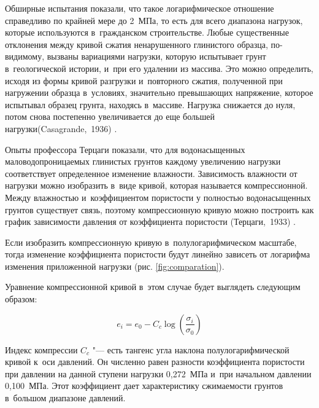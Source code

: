 Обширные испытания показали, что такое логарифмическое отношение справедливо по крайней мере до 2~МПа, то есть для всего диапазона нагрузок, которые используются в~гражданском строительстве.
Любые существенные отклонения между кривой сжатия ненарушенного глинистого образца, по-видимому, вызваны вариациями нагрузки, которую испытывает грунт в~геологической истории, и~при его удалении из массива.
Это можно определить, исходя из формы кривой разгрузки и~повторного сжатия, полученной при нагружении образца в~условиях, значительно превышающих напряжение, которое испытывал образец грунта, находясь в~массиве.
Нагрузка снижается до нуля, потом снова постепенно увеличивается до еще большей нагрузки(Casagrande,~1936) \cite{cazagrande1936}.

 Опыты профессора Терцаги показали, что для водонасыщенных маловодопроницаемых глинистых грунтов каждому увеличению нагрузки соответствует определенное изменение влажности. 
 Зависимость влажности от нагрузки можно изобразить в~виде кривой,
 которая называется компрессионной. 
 Между влажностью и~коэффициентом пористости у полностью водонасыщенных грунтов существует связь, поэтому компрессионную кривую можно построить как график зависимости давления от коэффициента пористости (Терцаги,~1933) \cite{terz1933}.



 Если изобразить компрессионную кривую в~полулогарифмическом масштабе, 
 тогда изменение коэффициента пористости будут линейно зависеть от логарифма изменения приложенной нагрузки (рис. \ref{fig:comparation}).

 \begin{sidewaysfigure}[p]
  \label{fig:comparation}
  \centering
  \small
  
  \caption{Сравнение компрессионой кривой в~линейном и~логарифмическом масштабе, (Casagrande, 1936) \cite{cazagrande1936}}
 \end{sidewaysfigure}


 Уравнение компрессионной кривой в~этом случае будет выглядеть следующим образом:
 
 \begin{equation}
 e_i=e_0-C_c \log \left( \frac{\sigma_i}{\sigma_0} \right)
 \label{eq:ke}
 \end{equation}
 
 Индекс компрессии $C_c$ "--- есть тангенс угла наклона полулогарифмической кривой к~оси давлений. Он численно равен разности коэффициента пористости при давлении на данной ступени нагрузки 0,272~МПа и~при начальном давлении 0,100~МПа. Этот коэффициент дает характеристику сжимаемости грунтов в~большом диапазоне давлений. 
 
